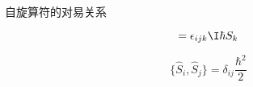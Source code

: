 \begin{theorem}{自旋算符的对易关系}\label{ComOpQ_the8}



\begin{equation}
[\hat{S}_i, \hat{S}_j]=\epsilon_{ijk}\I\hbar S_k
\end{equation}

\begin{equation}
\{\hat{S}_i, \hat{S}_j\}=\delta_{ij}\frac{\hbar^2}{2}
\end{equation}


\end{theorem}






